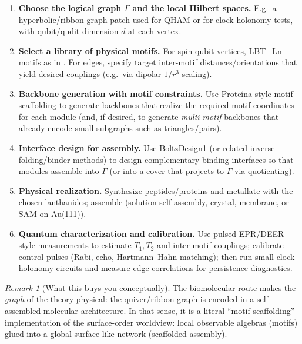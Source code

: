 \documentclass[11pt,oneside]{amsbook}
\numberwithin{equation}{section}
\theoremstyle{plain}
\theoremstyle{definition}
\theoremstyle{remark}
\newtheorem{remark}[theorem]{Remark}
\begin{document}
\begin{enumerate}
\item \textbf{Choose the logical graph $\Gamma$ and the local Hilbert spaces.}
E.g.\ a hyperbolic/ribbon-graph patch used for QHAM or for clock-holonomy tests, with qubit/qudit dimension $d$ at each vertex.

\item \textbf{Select a library of physical motifs.}
For spin-qubit vertices, LBT+Ln motifs as in \cite{Rosaleny2017PeptideQC}.
For edges, specify target inter-motif distances/orientations that yield desired couplings (e.g.\ via dipolar $1/r^3$ scaling).

\item \textbf{Backbone generation with motif constraints.}
Use Prote\'{i}na-style motif scaffolding \cite{Geffner2025Proteina} to generate backbones that realize the required motif coordinates for each module
(and, if desired, to generate \emph{multi-motif} backbones that already encode small subgraphs such as triangles/pairs).

\item \textbf{Interface design for assembly.}
Use BoltzDesign1 \cite{Cho2025BoltzDesign1} (or related inverse-folding/binder methods) to design complementary binding interfaces so that modules assemble into $\Gamma$
(or into a cover that projects to $\Gamma$ via quotienting).

\item \textbf{Physical realization.}
Synthesize peptides/proteins and metallate with the chosen lanthanides; assemble (solution self-assembly, crystal, membrane, or SAM on Au(111)).

\item \textbf{Quantum characterization and calibration.}
Use pulsed EPR/DEER-style measurements to estimate $T_1,T_2$ and inter-motif couplings; calibrate control pulses (Rabi, echo, Hartmann--Hahn matching);
then run small clock-holonomy circuits and measure edge correlations for persistence diagnostics.
\end{enumerate}

\begin{remark}[What this buys you conceptually]
The biomolecular route makes the \emph{graph} of the theory physical: the quiver/ribbon graph is encoded in a self-assembled molecular architecture.
In that sense, it is a literal ``motif scaffolding'' implementation of the surface-order worldview:
local observable algebras (motifs) glued into a global surface-like network (scaffolded assembly).
\end{remark}
\end{document}
